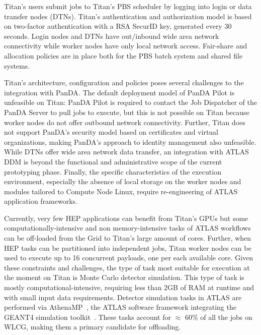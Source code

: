 
Titan's users submit jobs to Titan's PBS scheduler by logging into login or data
transfer nodes (DTNs). Titan's authentication and authorization model is based
on two-factor authentication with a RSA SecurID key, generated every 30 seconds.
Login nodes and DTNs have out/inbound wide area network connectivity while
worker nodes have only local network access. Fair-share and allocation policies
are in place both for the PBS batch system and shared file systems.


Titan's architecture, configuration and policies poses several challenges to the
integration with PanDA. The default deployment
model of PanDA Pilot is unfeasible on Titan: PanDA Pilot is required to contact
the Job Dispatcher of the PanDA Server to pull jobs to execute, but this is not
possible on Titan because worker nodes do not offer outbound network
connectivity. Further, Titan does not support PanDA's security model based on
certificates and virtual organizations, making PanDA's approach to identity
management also unfeasible. While DTNs offer wide area network data transfer, an
integration with ATLAS DDM is beyond the functional and administrative scope of
the current prototyping phase. Finally, the specific characteristics of the
execution environment, especially the absence of local storage on the worker
nodes and modules tailored to Compute Node Linux, require re-engineering of
ATLAS application frameworks.

Currently, very few HEP applications can benefit from Titan's GPUs but some
computationally-intensive and non memory-intensive tasks of ATLAS workflows can
be off-loaded from the Grid to Titan's large amount of cores. Further, when HEP
tasks can be partitioned into independent jobs, Titan worker nodes can be used to
execute up to 16 concurrent payloads, one per each available core. Given these
constraints and challenges, the type of task most suitable for execution at the
moment on Titan is Monte Carlo detector simulation. This type of task is mostly
computational-intensive, requiring less than 2GB of RAM at runtime and with
small input data requirements. Detector simulation tasks in ATLAS are performed
via AthenaMP~\cite{aad2010atlas}, the ATLAS software framework integrating the
GEANT4 simulation toolkit~\cite{agostinelli2003geant4}. These tasks account for
$\approx$ 60\% of all the jobs on WLCG, making them a primary candidate for
offloading.

